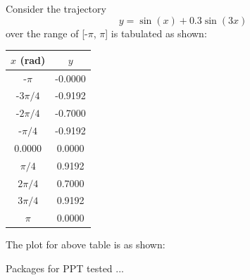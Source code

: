 \documentclass{beamer}
\begin{document}
 \begin{frame}[t]
\vspace{0.5cm}

\noindent Consider the trajectory\footnotemark[2] $$y = \sin(x) + 0.3\sin(3x)$$ over the range of [-$\pi$, $\pi$] is tabulated as shown:
\vskip 0.2cm

\begin{table}[h]
\begin{center} 
{
\begin{tabular}{cc}
\hline
$x$ (rad)	& $y$  		\\ \hline\hline
-$\pi$  	& -0.0000 	\\
-$3\pi/4$ 	& -0.9192	\\
-$2\pi/4$ 	& -0.7000 	\\ \hline
-$\pi/4$ 	& -0.9192	\\
0.0000  	& 0.0000 	\\
$\pi/4$  	& 0.9192	\\ \hline
$2\pi/4$ 	& 0.7000	\\
$3\pi/4$ 	& 0.9192	\\
$\pi$ 		& 0.0000 	\\\hline\hline
\end{tabular}}
\end{center}
\end{table}

\end{frame}
\begin{frame}
 
The plot for above table is as shown:\footnotemark[3]

\begin{minipage}[c]{1\textwidth}
\begin{center}
\end{center}
\end{minipage}

Packages for PPT tested ... 
\end{frame}
\end{document}

